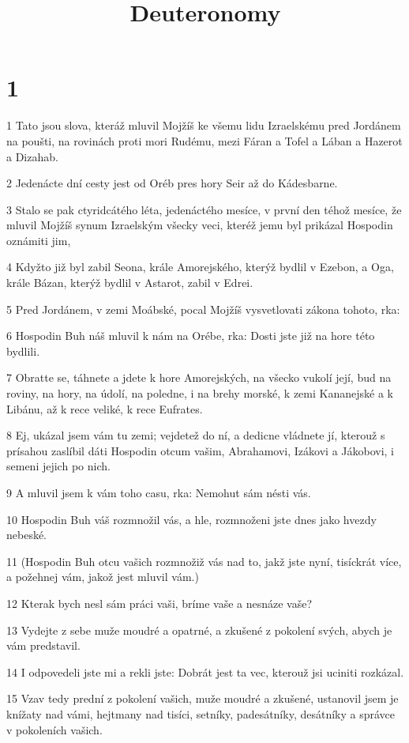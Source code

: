

\title{Deuteronomy}

\chapter{1}

\par 1 Tato jsou slova, kteráž mluvil Mojžíš ke všemu lidu Izraelskému pred Jordánem na poušti, na rovinách proti mori Rudému, mezi Fáran a Tofel a Lában a Hazerot a Dizahab.
\par 2 Jedenácte dní cesty jest od Oréb pres hory Seir až do Kádesbarne.
\par 3 Stalo se pak ctyridcátého léta, jedenáctého mesíce, v první den téhož mesíce, že mluvil Mojžíš synum Izraelským všecky veci, kteréž jemu byl prikázal Hospodin oznámiti jim,
\par 4 Kdyžto již byl zabil Seona, krále Amorejského, kterýž bydlil v Ezebon, a Oga, krále Bázan, kterýž bydlil v Astarot, zabil v Edrei.
\par 5 Pred Jordánem, v zemi Moábské, pocal Mojžíš vysvetlovati zákona tohoto, rka:
\par 6 Hospodin Buh náš mluvil k nám na Orébe, rka: Dosti jste již na hore této bydlili.
\par 7 Obratte se, táhnete a jdete k hore Amorejských, na všecko vukolí její, bud na roviny, na hory, na údolí, na poledne, i na brehy morské, k zemi Kananejské a k Libánu, až k rece veliké, k rece Eufrates.
\par 8 Ej, ukázal jsem vám tu zemi; vejdetež do ní, a dedicne vládnete jí, kterouž s prísahou zaslíbil dáti Hospodin otcum vašim, Abrahamovi, Izákovi a Jákobovi, i semeni jejich po nich.
\par 9 A mluvil jsem k vám toho casu, rka: Nemohut sám nésti vás.
\par 10 Hospodin Buh váš rozmnožil vás, a hle, rozmnoženi jste dnes jako hvezdy nebeské.
\par 11 (Hospodin Buh otcu vašich rozmnožiž vás nad to, jakž jste nyní, tisíckrát více, a požehnej vám, jakož jest mluvil vám.)
\par 12 Kterak bych nesl sám práci vaši, bríme vaše a nesnáze vaše?
\par 13 Vydejte z sebe muže moudré a opatrné, a zkušené z pokolení svých, abych je vám predstavil.
\par 14 I odpovedeli jste mi a rekli jste: Dobrát jest ta vec, kterouž jsi uciniti rozkázal.
\par 15 Vzav tedy prední z pokolení vašich, muže moudré a zkušené, ustanovil jsem je knížaty nad vámi, hejtmany nad tisíci, setníky, padesátníky, desátníky a správce v pokoleních vašich.

